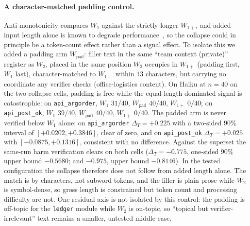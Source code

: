 \documentclass[11pt]{article}
\theoremstyle{plain}
\theoremstyle{definition}
\theoremstyle{remark}
\begin{document}
\paragraph{A character-matched padding control.}
Anti-monotonicity compares $W_1$ against the strictly longer $W_{1+}$, and added input length alone
is known to degrade performance~\citep{contexthurts2025}, so the collapse could in principle be a
token-count effect rather than a signal effect. To isolate this we added a padding arm
$W_{\mathrm{pad}}$: filler text in the same ``team context (private)'' register as $W_2$, placed in
the same position $W_2$ occupies in $W_{1+}$ (padding first, $W_1$ last), character-matched to
$W_{1+}$ within $13$ characters, but carrying no coordinate any verifier checks (office-logistics
content). On Haiku at $n=40$ on the two collapse cells, padding is free while the
equal-length dominated signal is catastrophic: on \texttt{api\_argorder}, $W_1$ $31/40$,
$W_{\mathrm{pad}}$ $40/40$, $W_{1+}$ $0/40$; on \texttt{api\_post\_ok}, $W_1$ $39/40$,
$W_{\mathrm{pad}}$ $40/40$, $W_{1+}$ $0/40$. The padded arm is never verified below $W_1$ alone:
on \texttt{api\_argorder} $\Delta_T=+0.225$ with a two-sided $90\%$ interval of
$[+0.0202,+0.3846]$, clear of zero, and on \texttt{api\_post\_ok} $\Delta_T=+0.025$ with
$[-0.0875,+0.1316]$, consistent with no difference. Against the superset the same-run harm
verification clears on both cells ($\Delta_T=-0.775$, one-sided $90\%$ upper bound $-0.5680$;
and $-0.975$, upper bound $-0.8146$). In the tested configuration the
collapse therefore does not follow from added length alone. The match is by characters, not
subword tokens, and the filler is plain prose while $W_2$ is symbol-dense, so gross length is
constrained but token count and processing difficulty are not. One residual axis is not
isolated by this control: the padding is off-topic for the \texttt{ledger}
module while $W_2$ is on-topic, so ``topical but verifier-irrelevant'' text remains a smaller,
untested middle case.
\end{document}
